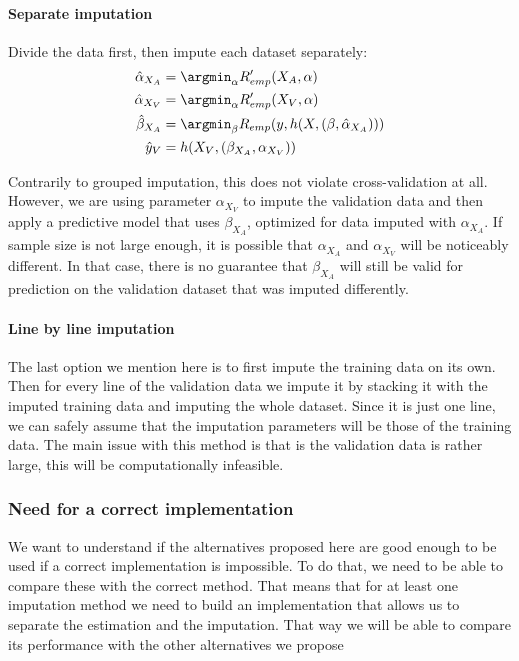 \paragraph{Separate imputation}
Divide the data first, then impute each dataset separately:
\begin{align*}
\hat{\alpha}_{X_A} &= \argmin_{\alpha} R_{emp}'(X_A, \alpha) \\
\hat{\alpha}_{X_V} &= \argmin_{\alpha} R_{emp}'(X_V, \alpha) \\
\hat{\beta}_{X_A} &= \argmin_{\beta} R_{emp}(y, h(X, (\beta, \hat{\alpha}_{X_A}))) \\
\hat{y}_V &= h(X_V, (\beta_{X_A}, \alpha_{X_V}))
\end{align*}

Contrarily to grouped imputation, this does not violate cross-validation at all. However, we are using parameter $\alpha_{X_V}$ to impute the validation data and then apply a predictive model that uses $\beta_{X_A}$, optimized for data imputed with $\alpha_{X_A}$. If sample size is not large enough, it is possible that $\alpha_{X_A}$ and $\alpha_{X_V}$ will be noticeably different. In that case, there is no guarantee that $\beta_{X_A}$ will still be valid for prediction on the validation dataset that was imputed differently. 

\paragraph{Line by line imputation}
The last option we mention here is to first impute the training data on its own. Then for every line of the validation data we impute it by stacking it with the imputed training data and imputing the whole dataset. Since it is just one line, we can safely assume that the imputation parameters will be those of the training data. The main issue with this method is that is the validation data is rather large, this will be computationally infeasible.

			\subsubsection{Need for a correct implementation}
We want to understand if the alternatives proposed here are good enough to be used if a correct implementation is impossible. To do that, we need to be able to compare these with the correct method. That means that for at least one imputation method we need to build an implementation that allows us to separate the estimation and the imputation. That way we will be able to compare its performance with the other alternatives we propose

